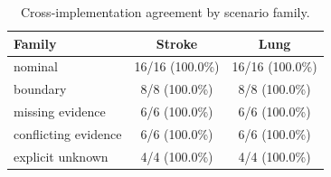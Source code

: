 \begin{table}[t]
\caption{Cross-implementation agreement by scenario family.}
\label{tab:independent_by_family}
\centering
\footnotesize
\begin{tabular}{lcc}
\hline
Family & Stroke & Lung \\
\hline
nominal & 16/16 (100.0\%) & 16/16 (100.0\%) \\
boundary & 8/8 (100.0\%) & 8/8 (100.0\%) \\
missing evidence & 6/6 (100.0\%) & 6/6 (100.0\%) \\
conflicting evidence & 6/6 (100.0\%) & 6/6 (100.0\%) \\
explicit unknown & 4/4 (100.0\%) & 4/4 (100.0\%) \\
\hline
\end{tabular}
\end{table}
